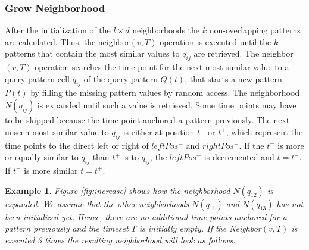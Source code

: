 \documentclass[abstracton,12pt]{scrreprt}
\newtheorem{example}{Example}
\begin{document}
\subsubsection{Grow Neighborhood}
After the initialization of the $l \times d$ neighborhoods the $k$ non-overlapping patterns are calculated. Thus, the neighbor$(v, T)$ operation is executed until the $k$ patterns that contain the most similar values to $q_{ij}$ are retrieved.
The neighbor$(v, T)$ operation searches the time point for the next most similar value to a query pattern cell $q_{ij}$ of the query pattern $Q(t)$, that starts a new pattern $P(t)$ by filling the missing pattern values by random access. The neighborhood $N(q_{ij})$ is expanded until such a value is retrieved. Some time points may have to be skipped because the time point anchored a pattern previously. The next unseen most similar value to $q_{ij}$ is either at position $t^-$ or $t^+$, which represent the time points to the direct left or right of $leftPos^-$ and $rightPos^+$. If the $t^-$ is more or equally similar to $q_{ij}$ than $t^+$ is to $q_{ij}$, the $leftPos^-$ is decremented and $t=t^-$. If $t^+$ is more similar $t=t^+$.

\begin{example}
Figure \ref{fig:increase} shows how the neighborhood $N(q_{12})$ is expanded. We assume that the other neighborhoods $N(q_{11})$ and $N(q_{13})$ has not been initialized yet. 
Hence, there are no additional time points anchored for a pattern previously and the timeset $T$ is initially empty. If the Neighbor$(v,T)$ is executed 3 times the resulting neighborhood will look as follows:  
\end{example}
\end{document}
